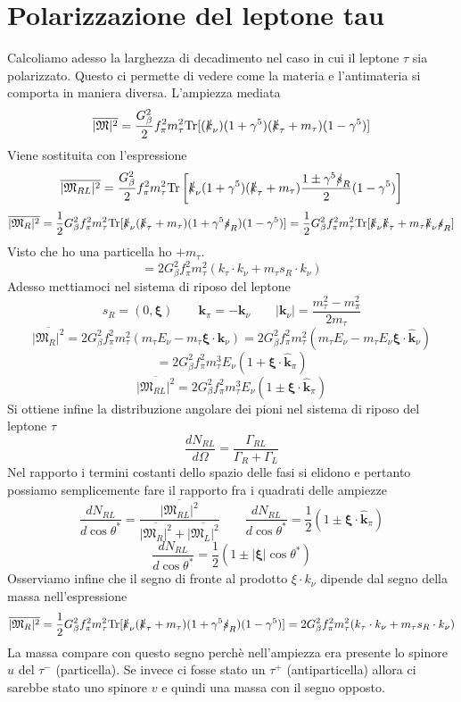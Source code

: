 \section{Polarizzazione del leptone tau}
Calcoliamo adesso la larghezza di decadimento nel caso in cui il leptone $\tau$ sia polarizzato. Questo ci permette di vedere come la materia e l'antimateria si comporta in maniera diversa. L'ampiezza mediata
$$
\overline{|\mathfrak{M}|^2} = \frac{G_\beta^2}{2} f_\pi^2 m_\tau^2 \text{Tr} [(\slashed{k}_\nu)(1 + \gamma^5)(\slashed{k}_\tau + m_\tau)(1 - \gamma^5)]
$$
Viene sostituita con l'espressione
$$
\overline{|\mathfrak{M}_{RL}|^2} = \frac{G_\beta^2}{2} f_\pi^2 m_\tau^2 \text{Tr} \left[ \slashed{k}_\nu (1 + \gamma^5) (\slashed{k}_\tau + m_\tau) \frac{1 \pm \gamma^5 \slashed{s}_R}{2} (1 - \gamma^5) \right]
$$
$$
\overline{|\mathfrak{M}_R|^2} = \frac{1}{2} G_\beta^2 f_\pi^2 m_\tau^2 \text{Tr} [ \slashed{k}_\nu (\slashed{k}_\tau + m_\tau) (1 + \gamma^5 \slashed{s}_R) (1 - \gamma^5) ] = \frac{1}{2} G_\beta^2 f_\pi^2 m_\tau^2 \text{Tr} [\slashed{k}_\nu \slashed{k}_\tau + m_\tau \slashed{k}_\nu \slashed{s}_R]
$$
Visto che ho una particella ho $+m_\tau$.
$$
= 2 G_\beta^2 f_\pi^2 m_\tau^2 (k_\tau \cdot k_\nu + m_\tau s_R \cdot k_\nu)
$$
Adesso mettiamoci nel sistema di riposo del leptone
$$
s_R = (0, \boldsymbol{\xi}) \quad \quad \mathbf{k}_\pi = -\mathbf{k}_\nu \quad \quad |\mathbf{k}_\nu| = \frac{m_\tau^2 - m_\pi^2}{2m_\tau}
$$
$$
\overline{|\mathfrak{M}_R|^2} = 2 G_\beta^2 f_\pi^2 m_\tau^2 (m_\tau E_\nu - m_\tau \boldsymbol{\xi} \cdot \mathbf{k}_\nu) = 2 G_\beta^2 f_\pi^2 m_\tau^2 (m_\tau E_\nu - m_\tau E_\nu \boldsymbol{\xi} \cdot \hat{\mathbf{k}}_\nu)
$$
$$
= 2 G_\beta^2 f_\pi^2 m_\tau^3 E_\nu (1 + \boldsymbol{\xi} \cdot \hat{\mathbf{k}}_\pi)
$$
$$
\overline{|\mathfrak{M}_{RL}|^2} = 2 G_\beta^2 f_\pi^2 m_\tau^3 E_\nu (1 \pm \boldsymbol{\xi} \cdot \hat{\mathbf{k}}_\pi)
$$
Si ottiene infine la distribuzione angolare dei pioni nel sistema di riposo del leptone $\tau$
$$
\frac{dN_{RL}}{d\Omega} = \frac{\Gamma_{RL}}{\Gamma_R + \Gamma_L}
$$
Nel rapporto i termini costanti dello spazio delle fasi si elidono e pertanto possiamo semplicemente fare il rapporto fra i quadrati delle ampiezze
$$
\frac{dN_{RL}}{d \cos \theta^*} = \frac{\overline{|\mathfrak{M}_{RL}|^2}}{\overline{|\mathfrak{M}_R|^2} + \overline{|\mathfrak{M}_L|^2}} \qquad \frac{dN_{RL}}{d \cos \theta^*} = \frac{1}{2} (1 \pm \boldsymbol{\xi} \cdot \hat{\mathbf{k}}_\pi)
$$
$$
\frac{dN_{RL}}{d \cos \theta^*} = \frac{1}{2} (1 \pm |\boldsymbol{\xi}| \cos \theta^*)
$$
Osserviamo infine che il segno di fronte al prodotto $\xi\cdot k_\nu$ dipende dal segno della massa nell'espressione
$$
\overline{|\mathfrak{M}_R|^2} = \frac{1}{2} G_\beta^2 f_\pi^2 m_\tau^2 \text{Tr} [\slashed{k}_\nu (\slashed{k}_\tau + m_\tau)(1 + \gamma^5 \slashed{s}_R)(1 - \gamma^5)] = 2 G_\beta^2 f_\pi^2 m_\tau^2 (k_\tau \cdot k_\nu + m_\tau s_R \cdot k_\nu)
$$
La massa compare con questo segno perchè nell'ampiezza era presente lo spinore $u$ del $\tau^-$ (particella). Se invece ci fosse stato un $\tau^+$ (antiparticella) allora ci sarebbe stato uno spinore $v$ e quindi una massa con il segno opposto.

